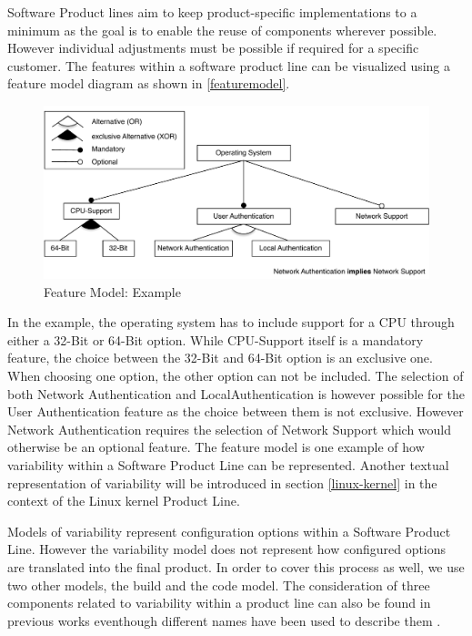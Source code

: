 \documentclass[a4paper]{article}
\begin{document}
Software Product lines aim to keep product-specific implementations to a minimum as the goal is to enable the reuse of components wherever possible. However individual adjustments must be possible if required for a specific customer. The features within a software product line can be visualized using a feature model diagram as shown in \autoref{featuremodel}. 

\begin{figure}[h] 
  \centering
  \begin{minipage}[b]{1\textwidth} 
    \caption[Feature Model]{Feature Model: Example}\label{featuremodel}
    \includegraphics[width=1\textwidth]{img/featuremodel.pdf}
  \end{minipage}
\end{figure}

In the example, the operating system has to include support for a CPU through either a 32-Bit or 64-Bit option. While CPU-Support itself is a mandatory feature, the choice between the 32-Bit and 64-Bit option is an exclusive one. When choosing one option, the other option can not be included. The selection of both Network Authentication and LocalAuthentication is however possible for the User Authentication feature as the choice between them is not exclusive. However Network Authentication requires the selection of Network Support which would otherwise be an optional feature. The feature model is one example of how variability within a Software Product Line can be represented. Another textual representation of variability will be introduced in section \ref{linux-kernel} in the context of the Linux kernel Product Line. 

Models of variability represent configuration options within a Software Product Line. However the variability model does not represent how configured options are translated into the final product. In order to cover this process as well, we use two other models, the build and the code model. The consideration of three components related to variability within a product line can also be found in previous works eventhough different names have been used to describe them \cite{nadi-linux-kernel} \cite{mining-kbuild} \cite{KroeherEl-SharkawySchmid18}.
\end{document}
